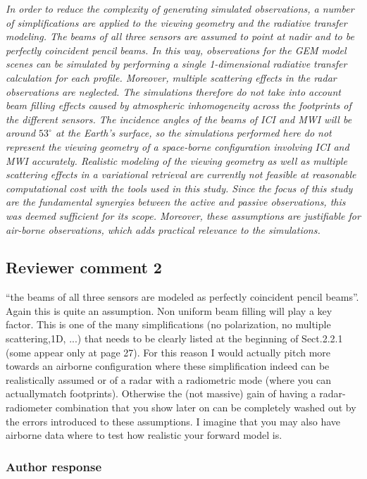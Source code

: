 \documentclass[11pt]{scrartcl}
\begin{document}
\textit{
In order to reduce the complexity of generating simulated observations, a number
of simplifications are applied to the viewing geometry and the radiative
transfer modeling. The beams of all three sensors are assumed to point at nadir
and to be perfectly coincident pencil beams. In this way, observations for the
GEM model scenes can be simulated by performing a single 1-dimensional radiative
transfer calculation for each profile. Moreover, multiple scattering effects in
the radar observations are neglected. The simulations therefore do not take into
account beam filling effects caused by atmospheric inhomogeneity across the
footprints of the different sensors. The incidence angles of the beams of ICI
and MWI will be around $53^\circ$ at the Earth's surface, so the simulations
performed here do not represent the viewing geometry of a space-borne
configuration involving ICI and MWI accurately. Realistic modeling of the
viewing geometry as well as multiple scattering effects in a variational
retrieval are currently not feasible at reasonable computational cost with the
tools used in this study. Since the focus of this study are the fundamental
synergies between the active and passive observations, this was deemed
sufficient for its scope. Moreover, these assumptions are justifiable for
air-borne observations, which adds practical relevance to the simulations.
}

\subsection*{Reviewer comment 2}

 “the beams of all three sensors are modeled as perfectly coincident pencil
beams”. Again this is quite an assumption. Non uniform beam filling will play a
key factor. This is one of the many simplifications (no polarization, no multiple
scattering,1D, ...) that needs to be clearly listed at the beginning of
Sect.2.2.1 (some appear only at page 27). For this reason I would actually pitch
more towards an airborne configuration where these simplification indeed can
be realistically assumed or of a radar with a radiometric mode (where you can
actuallymatch footprints). Otherwise the (not massive) gain of having a
radar-radiometer combination that you show later on can be completely washed
out by the errors introduced to these assumptions. I imagine that you may also
have airborne data where to test how realistic your forward model is.

\subsubsection*{Author response}
\end{document}
